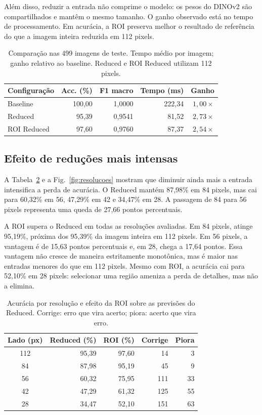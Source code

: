 \documentclass[conference]{IEEEtran}
\begin{document}
Além disso, reduzir a entrada não comprime o modelo: os pesos do DINOv2
são compartilhados e mantêm o mesmo tamanho. O ganho observado está
no tempo de processamento. Em acurácia, a ROI preserva melhor o
resultado de referência do que a imagem inteira reduzida em 112 pixels.

\begin{table}[t]
\caption{Comparação nas 499 imagens de teste. Tempo médio por imagem;
ganho relativo ao baseline. Reduced e ROI Reduced utilizam 112 pixels.}
\label{tab:principal}
\centering
\footnotesize
\setlength{\tabcolsep}{4pt}
\begin{tabular}{lrrrr}
\toprule
Configuração & Acc. (\%) & F1 macro & Tempo (ms) & Ganho \\
\midrule
Baseline    & 100,00 & 1,0000 & 222,34 & $1{,}00\times$ \\
Reduced     & 95,39  & 0,9541 & 81,52  & $2{,}73\times$ \\
ROI Reduced & 97,60  & 0,9760 & 87,37  & $2{,}54\times$ \\
\bottomrule
\end{tabular}
\end{table}

\subsection{Efeito de reduções mais intensas}
A Tabela~\ref{tab:resolucoes} e a Fig.~\ref{fig:resolucoes} mostram
que diminuir ainda mais a entrada intensifica a perda de acurácia.
O Reduced mantém 87,98\% em 84 pixels, mas cai para 60,32\% em 56,
47,29\% em 42 e 34,47\% em 28. A passagem de 84 para 56 pixels
representa uma queda de 27,66 pontos percentuais.

A ROI supera o Reduced em todas as resoluções avaliadas. Em 84 pixels,
atinge 95,19\%, próxima dos 95,39\% da imagem inteira em 112 pixels.
Em 56 pixels, a vantagem é de 15,63 pontos percentuais e, em 28,
chega a 17,64 pontos. Essa vantagem não cresce de maneira estritamente
monotônica, mas é maior nas entradas menores do que em 112 pixels.
Mesmo com ROI, a acurácia cai para 52,10\% em 28 pixels: selecionar
uma região ameniza a perda de detalhes, mas não a elimina.

\begin{table}[t]
\caption{Acurácia por resolução e efeito da ROI sobre as previsões do
Reduced. Corrige: erro que vira acerto; piora: acerto que vira erro.}
\label{tab:resolucoes}
\centering
\footnotesize
\setlength{\tabcolsep}{4pt}
\begin{tabular}{crrrr}
\toprule
Lado (px) & Reduced (\%) & ROI (\%) & Corrige & Piora \\
\midrule
112 & 95,39 & 97,60 & 14  & 3  \\
84  & 87,98 & 95,19 & 45  & 9  \\
56  & 60,32 & 75,95 & 111 & 33 \\
42  & 47,29 & 61,32 & 125 & 55 \\
28  & 34,47 & 52,10 & 151 & 63 \\
\bottomrule
\end{tabular}
\end{table}
\end{document}
